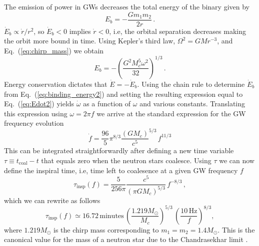 \documentclass[prd,amsmath,amssymb,aps,floats,amsfonts,notitlepage,superscriptaddress,eqsecnum,nofootinbib,10pt]{revtex4-1}
\newcommand{\f}{\frac}
\newcommand{\be}{\begin{equation}}
\newcommand{\ee}{\end{equation}}
\begin{document}
The emission of power in GWs decreases the total energy of the binary given by
%
\be
E_b = -\frac{G m_1 m_2}{2r}\,.  \label{eq:binding_energy1}
\ee
%
$\dot{E}_b \propto \dot{r}/r^2$, so $\dot{E}_b < 0$ implies $\dot{r}<0$, i.e, the orbital separation decreases
making the orbit more bound in time.
Using Kepler's third law, $ \Omega^2 = G M r^{-3}$, and Eq.~(\ref{eq:chirp_mass}) we obtain
%
\be
E_b = -\left(\f{G^2 M_c^5 \omega^2}{32}\right)^{1/3}\, . \label{eq:binding_energy2}
\ee
%
Energy conservation dictates that $\dot{E}=-\dot{E}_b$. Using the chain rule to determine $\dot{E}_b$ from Eq.~(\ref{eq:binding_energy2})
and setting the resulting expression equal to Eq.~(\ref{eq:Edot2}) yields $\dot{\omega}$ as a function of $\omega$ and various constants.
Translating this expression using $\omega=2\pi f$ we arrive at the standard expression for the GW frequency evolution
%
\be
\dot{f} = \f{96}{5}\pi^{8/3} \f{(G M_c)}{c^5}^{5/3}\, f^{11/3} \label{eq:fdot}
\ee
%
This can be integrated straightforwardly after defining a new time variable $\tau\equiv t_\text{coal}-t$ that equals zero when the neutron stars coalesce.
Using $\tau$ we can now define the inspiral time, i.e, time left to coalesence at a given GW frequency $f$
%
\be
\tau_\text{insp}(f) = \f{5}{256\pi}\f{c^5}{(\pi G M_c)^{5/3}} \,f^{-8/3}\label{eq:tau_insp}\, ,
\ee
%
%
%
which we can rewrite as follows
%
\be
\tau_\text{insp}(f) \simeq 16.72\,\text{minutes} \, \left(\f{1.219 M_\odot}{M_c}\right)^{5/3}\,\left(\f{10\,\text{Hz}}{f}\right)^{8/3}, \label{eq:tau_insp2}
\ee
%
where $1.219 M_\odot$ is the chirp mass corresponding to $m_1=m_2=1.4 M_\odot$. This is the canonical value for the 
mass of a neutron star due to the Chandrasekhar limit \cite{Chandra}.
\end{document}
